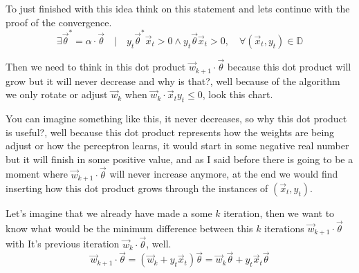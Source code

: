 To just finished with this idea think on this statement
and lets continue with the proof of the convergence.
\[
  \exists \vec{\theta}^* = \alpha \cdot \vec{\theta}\quad|\quad
  y_t\vec{\theta}^*\vec{x}_t > 0 \wedge
  y_t\vec{\theta}\vec{x}_t > 0,
  \quad \forall(\vec{x}_t, y_t)
  \in \mathbb{D}
\]

Then we need to think in this
dot product $\vec{w}_{k + 1} \cdot \vec{\theta}$ because this dot product
will grow but it will never decrease and why is that?, well because of the algorithm we only
rotate or adjust $\vec{w}_{k}$ when $\vec{w}_k \cdot \vec{x}_ty_t \le 0$, look this chart.
\begin{center}
\end{center}
You can imagine something like this, it never decreases, so why this dot product is useful?, well
because this dot product represents how the weights are being adjust or how the perceptron learns,
it would start in some negative real number but it will finish in some positive value,
and as I said before there is going to be a moment where $\vec{w}_{k+1} \cdot \vec{\theta}$
will never increase
anymore, at the end we would find inserting how this dot product grows through
the instances of $(\vec{x}_t, y_t)$.
\begin{center}
\end{center}
Let's imagine that we already have made a some $k$ iteration,
then we want to know what would be 
the minimum difference between this $k$ iterations $\vec{w}_{k+1} \cdot \vec{\theta}$ with It's
previous iteration $\vec{w}_{k} \cdot \vec{\theta}$, well.
\[
  \vec{w}_{k + 1} \cdot \vec{\theta} = (\vec{w}_{k} + y_t\vec{x}_t) \vec{\theta}
  = \vec{w}_{k}\vec{\theta} + y_t\vec{x}_t\vec{\theta}
\]
